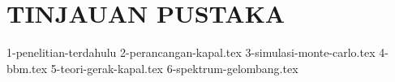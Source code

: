 \chapter{TINJAUAN PUSTAKA}
\label{chap:tinjauanpustaka}

{1-penelitian-terdahulu}
{2-perancangan-kapal.tex}
{3-simulasi-monte-carlo.tex}
{4-bbm.tex}
{5-teori-gerak-kapal.tex}
{6-spektrum-gelombang.tex}
